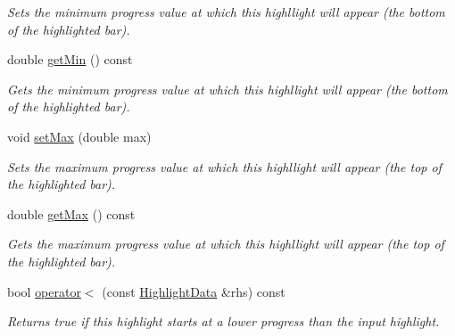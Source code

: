 \begin{DoxyCompactItemize}
\begin{DoxyCompactList}\small\item\em Sets the minimum progress value at which this highllight will appear (the bottom of the highlighted bar). \end{DoxyCompactList}\item 
\hypertarget{class_highlight_data_acd27460a9e7bf6af838a51335a2f92eb}{double \hyperlink{class_highlight_data_acd27460a9e7bf6af838a51335a2f92eb}{get\-Min} () const }\label{class_highlight_data_acd27460a9e7bf6af838a51335a2f92eb}

\begin{DoxyCompactList}\small\item\em Gets the minimum progress value at which this highllight will appear (the bottom of the highlighted bar). \end{DoxyCompactList}\item 
\hypertarget{class_highlight_data_a25303b2b17210c8f5dd3bd24835ce391}{void \hyperlink{class_highlight_data_a25303b2b17210c8f5dd3bd24835ce391}{set\-Max} (double max)}\label{class_highlight_data_a25303b2b17210c8f5dd3bd24835ce391}

\begin{DoxyCompactList}\small\item\em Sets the maximum progress value at which this highllight will appear (the top of the highlighted bar). \end{DoxyCompactList}\item 
\hypertarget{class_highlight_data_a08de32d707aeecd3ef49331741be6305}{double \hyperlink{class_highlight_data_a08de32d707aeecd3ef49331741be6305}{get\-Max} () const }\label{class_highlight_data_a08de32d707aeecd3ef49331741be6305}

\begin{DoxyCompactList}\small\item\em Gets the maximum progress value at which this highllight will appear (the top of the highlighted bar). \end{DoxyCompactList}\item 
\hypertarget{class_highlight_data_ab9435aa585e5dd9894c65a44b96f3c4f}{bool \hyperlink{class_highlight_data_ab9435aa585e5dd9894c65a44b96f3c4f}{operator$<$} (const \hyperlink{class_highlight_data}{Highlight\-Data} \&rhs) const }\label{class_highlight_data_ab9435aa585e5dd9894c65a44b96f3c4f}

\begin{DoxyCompactList}\small\item\em Returns true if this highlight starts at a lower progress than the input highlight. \end{DoxyCompactList}\end{DoxyCompactItemize}



